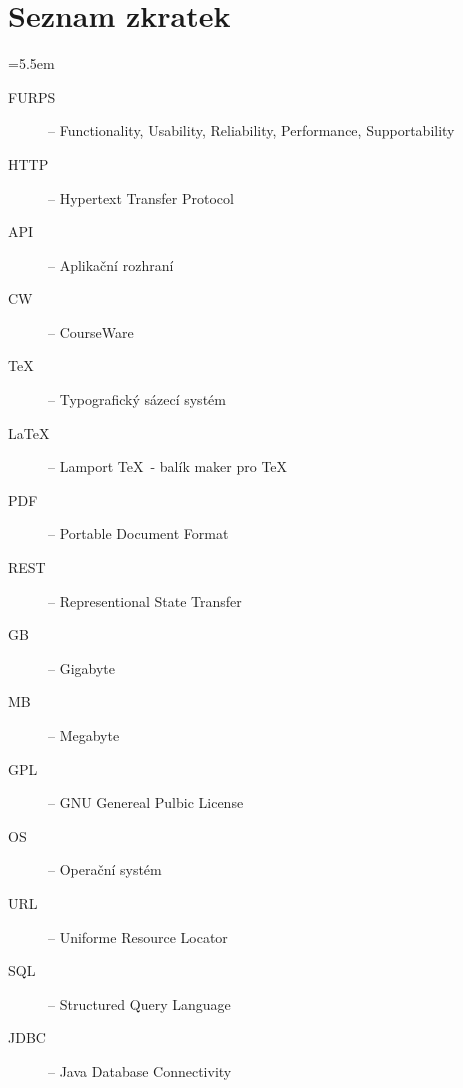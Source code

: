 \appendix

\chapter{Seznam zkratek}

\medskip
\bgroup \leftskip=5.5em

\begin{description}
	
	\item[FURPS] -- Functionality, Usability, Reliability, Performance, Supportability
	
	\item[HTTP] -- Hypertext Transfer Protocol
	
	\item[API] -- Aplikační rozhraní
	
	\item[CW] -- CourseWare
	
	\item[\TeX] -- Typografický sázecí systém
	
	\item[\LaTeX] -- Lamport \TeX\ - balík maker pro \TeX
	
	\item[PDF] -- Portable Document Format
	
	\item[REST] -- Representional State Transfer
	
	\item[GB] -- Gigabyte
	
	\item[MB] -- Megabyte
	
	\item[GPL] -- GNU Genereal Pulbic License
	
	\item[OS] -- Operační systém
	
	\item[URL] -- Uniforme Resource Locator 
	
	\item[SQL] -- Structured Query Language
	
	\item[JDBC] -- Java Database Connectivity
	
	

\end{description}

\par\egroup